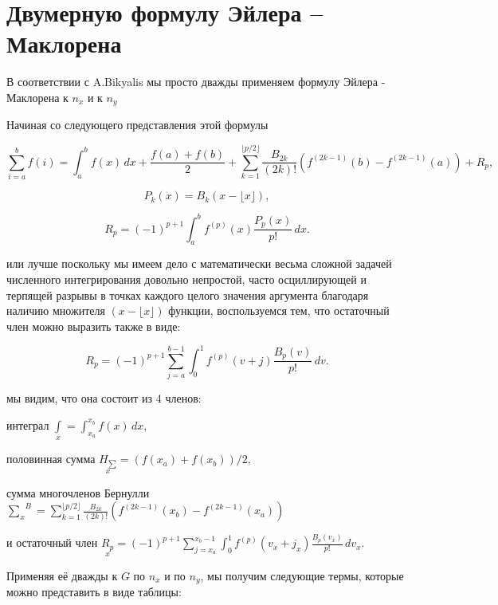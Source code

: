 \documentclass[11pt]{article}
\begin{document}
\section{Двумерную формулу Эйлера --
Маклорена}\label{ux434ux432ux443ux43cux435ux440ux43dux443ux44e-ux444ux43eux440ux43cux443ux43bux443-ux44dux439ux43bux435ux440ux430-ux43cux430ux43aux43bux43eux440ux435ux43dux430}

В соответствии с A.Bikyalis \cite{Bikyalis1968} мы просто дважды
применяем формулу Эйлера - Маклорена к \(n_x\) и к \(n_y\)

Начиная со следующего представления этой формулы

\[{\displaystyle \sum _{i=a}^{b}f(i)=\int _{a}^{b}f(x)\,dx+{\frac {f(a)+f(b)}{2}}+\sum _{k=1}^{\lfloor p/2\rfloor }{\frac {B_{2k}}{(2k)!}}\left(f^{(2k-1)}(b)-f^{(2k-1)}(a)\right)+R_{p},}\]

\[{\displaystyle P_{k}(x)=B_{k}\left(x-\lfloor x\rfloor \right),}\]

\[{\displaystyle R_{p}=(-1)^{p+1}\int _{a}^{b}f^{(p)}(x){\frac {P_{p}(x)}{p!}}\,dx.}\]

или лучше поскольку мы имеем дело с математически весьма сложной задачей
численного интегрирования довольно непростой, часто осциллирующей и
терпящей разрывы в точках каждого целого значения аргумента благодаря
наличию множителя \((x-\lfloor x\rfloor )\) функции, воспользуемся тем,
что остаточный член можно выразить также в виде:

\[{\displaystyle R_{p}=(-1)^{p+1}\sum_{j=a}^{b-1} \int _{0}^{1}f^{(p)}(v+j){\frac {B_{p}(v)}{p!}}\,dv.}\]

мы видим, что она состоит из 4 членов:

интеграл \(\int\limits_{x}^{}=\int _{x_a}^{x_b}f(x)\,dx\),

половинная сумма
\(\underset{x}{H_{\sum}}={\left( {f(x_a)+f(x_b)}\right)/{2}}\),

сумма многочленов Бернулли
\({\sum\limits_{x}^{}}^{B}=\sum _{k=1}^{\lfloor p/2\rfloor }{\frac {B_{2k}}{(2k)!}}\left(f^{(2k-1)}(x_b)-f^{(2k-1)}(x_a)\right)\)

и остаточный член
\(\underset{x}{R_{p}}=(-1)^{p+1}\sum_{j=x_a}^{x_b-1} \int _{0}^{1}f^{(p)}(v_x+j_x){\frac {B_{p}(v_x)}{p!}}\,dv_x\).

Применяя её дважды к \(G\) по \(n_x\) и по \(n_y\), мы получим следующие
термы, которые можно представить в виде таблицы:
\end{document}
